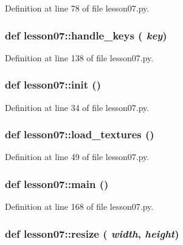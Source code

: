 Definition at line 78 of file lesson07.py.
\subsubsection{\setlength{\rightskip}{0pt plus 5cm}def lesson07::handle\_\-keys ( {\em key})}\label{namespacelesson07_24bd0f21e0e931e4f537a568627122b4}




Definition at line 138 of file lesson07.py.
\subsubsection{\setlength{\rightskip}{0pt plus 5cm}def lesson07::init ()}\label{namespacelesson07_6d044e9bfaf89096882901ceaa9f001e}




Definition at line 34 of file lesson07.py.
\subsubsection{\setlength{\rightskip}{0pt plus 5cm}def lesson07::load\_\-textures ()}\label{namespacelesson07_57a9a60a1a363dc3fb9d54c053b14b49}




Definition at line 49 of file lesson07.py.
\subsubsection{\setlength{\rightskip}{0pt plus 5cm}def lesson07::main ()}\label{namespacelesson07_5440555ca8920b745642e241a8f8a6eb}




Definition at line 168 of file lesson07.py.
\subsubsection{\setlength{\rightskip}{0pt plus 5cm}def lesson07::resize ( {\em width},  {\em height})}\label{namespacelesson07_ba509cac925273f6ef8582ba50ada33e}




